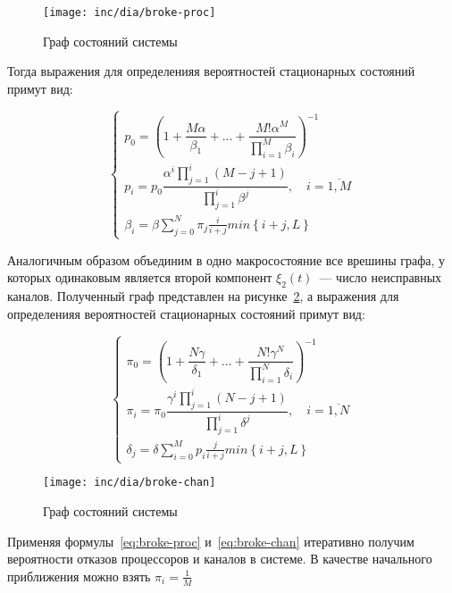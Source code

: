 \documentclass[utf8x, 12pt]{G7-32} %
\begin{document}
\begin{figure}[ht]
\centering
\texttt{[image: inc/dia/broke-proc]}
\caption{Граф состояний системы}
\label{fig:broke-proc}
\end{figure}

Тогда выражения для определенияя вероятностей стационарных состояний примут вид:

\begin{equation}
\label{eq:broke-proc}
\left\{
   \begin{array}{lcl}
	p_{0} = \left( 1 + \dfrac{M \alpha}{\beta_1} +  ... + \dfrac{M! \alpha^{M}}{\prod \limits_{i=1}^M \beta_i} \right) ^{-1} \\
	p_{i} = p_{0} \dfrac{\alpha^{i}\prod \limits_{j=1}^{i} (M-j+1)}{\prod \limits_{j=1}^i \beta^{j}}, \quad i = \overline{1,M}  \\ 
	\beta_i=\beta\sum\limits_{j=0}^N\pi_j\frac{i}{i+j}min\left\lbrace i+j,L\right\rbrace
   \end{array}
\right.
\end{equation}
 
Аналогичным образом объединим в одно макросостояние все врешины графа, у которых одинаковым является второй компонент $\xi_{2}(t)$~--- число неисправных каналов. Полученный граф представлен на рисунке~\ref{fig:broke-chan}, а выражения для определенияя вероятностей стационарных состояний примут вид:

\begin{equation}
\label{eq:broke-chan}
\left\{
   \begin{array}{lcl}
	\pi_{0} = \left( 1 + \dfrac{N \gamma}{\delta_1} +  ... + \dfrac{N! \gamma^{N}}{\prod \limits_{i=1}^N \delta_i} \right) ^{-1} \\
	\pi_{i} = \pi_{0} \dfrac{\gamma^{i}\prod \limits_{j=1}^{i} (N-j+1)}{\prod \limits_{j=1}^i \delta^{j}}, \quad i = \overline{1,N}  \\ 
	\delta_j=\delta\sum\limits_{i=0}^M p_i\frac{j}{i+j}min\left\lbrace i+j,L\right\rbrace
   \end{array}
\right.
\end{equation}

\begin{figure}[ht]
\centering
\texttt{[image: inc/dia/broke-chan]}
\caption{Граф состояний системы}
\label{fig:broke-chan}
\end{figure}

Применяя формулы~\ref{eq:broke-proc} и~\ref{eq:broke-chan} итеративно получим вероятности отказов процессоров и каналов в системе. В качестве начального приближения можно взять $\pi_i=\frac{1}{M}$
\end{document}
